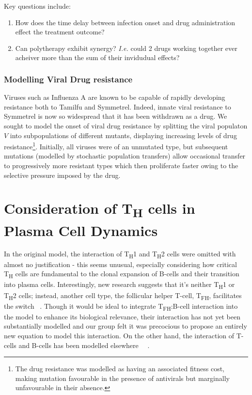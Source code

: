 \documentclass[a4paper, 12pt]{report}
\begin{document}
Key questions include:
\begin{enumerate}
\item How does the time delay between infection onset and drug administration effect the treatment outcome?
\item Can polytherapy exhibit synergy? \textit{I.e.} could 2 drugs working together ever acheiver more than the sum of their invidudual effects?
\end{enumerate}

\subsubsection{Modelling Viral Drug resistance}

Viruses such as Influenza A are known to be capable of rapidly developing resistance both to Tamilfu and Symmetrel.
Indeed, innate viral resistance to Symmetrel is now so widespread that it has been withdrawn as a drug.
We sought to model the onset of viral drug resistance by splitting the viral populaton $V$ into subpopulations of different mutants, displaying increasing levels of drug resistance\footnote{The drug resistance was modelled as having an associated fitness cost, making mutation favourable in the presence of antivirals but marginally unfavourable in their absence.}. Initially, all viruses were of an unmutated type, but subsequent mutations (modelled by stochastic population transfers) allow occasional transfer to progressively more resistant types which then proliferate faster owing to the selective pressure imposed by the drug.

\section{Consideration of T\textsubscript{H} cells in Plasma Cell Dynamics} %
In the original model, the interaction of T\textsubscript{H}1 and T\textsubscript{H}2 cells were omitted with almost no justification - this seems unusual, especially considering how critical T\textsubscript{H} cells are fundamental to the clonal expansion of B-cells and their transition into plasma cells. Interestingly, new research suggests that it's neither T\textsubscript{H}1 or T\textsubscript{H}2 cells; instead, another cell type, the follicular helper T-cell, T\textsubscript{FH}, facilitates the switch ~\cite{Swain}. Though it would be ideal to integrate T\textsubscript{FH}:B-cell interaction into the model to enhance its biological relevance, their interaction has not yet been substantially modelled and our group felt it was precocious to propose an entirely new equation to model this interaction. On the other hand, the interaction of T-cells and B-cells has been modelled elsewhere ~\cite{Carneiro1}~\cite{Carneiro2}.\\ 
\end{document}
